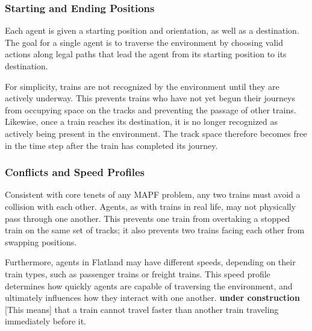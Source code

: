 \documentclass[11pt]{article}
\begin{document}
\subsubsection{Starting and Ending Positions}
\label{sec:Positions}
Each agent is given a starting position and orientation, as well as a destination.  The goal for a single agent is to traverse the environment by choosing valid actions along legal paths that lead the agent from its starting position to its destination.  

For simplicity, trains are not recognized by the environment until they are actively underway.  This prevents trains who have not yet begun their journeys from occupying space on the tracks and preventing the passage of other trains.  Likewise, once a train reaches its destination, it is no longer recognized as actively being present in the environment.  The track space therefore becomes free in the time step after the train has completed its journey.

\subsubsection{Conflicts and Speed Profiles}
\label{sec:Conflicts}
Consistent with core tenets of any MAPF problem, any two trains must avoid a collision with each other.  Agents, as with trains in real life, may not physically pass through one another.  This prevents one train from overtaking a stopped train on the same set of tracks; it also prevents two trains facing each other from swapping positions.

Furthermore, agents in Flatland may have different speeds, depending on their train types, such as passenger trains or freight trains.  This speed profile determines how quickly agents are capable of traversing the environment, and ultimately influences how they interact with one another.  \textbf{under construction} [This means] that a train cannot travel faster than another train traveling immediately before it.





\end{document}
